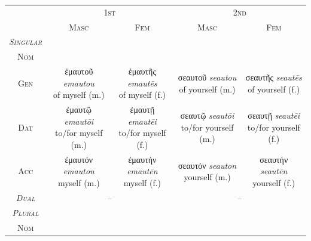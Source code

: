 \documentclass[10pt,a4paper,notitlepage]{article}
\newcommand{\tsc}[1]{\textsc{#1}}
\newcommand*{\grc}[1]{\fontspec{Inter}#1\rmfamily}
\newcommand{\trc}[1]{\textit{\fontspec{Tinos}#1}}
\begin{document}
    \begin{table}[H]
        \begin{tabular}{c|cccc}
             & \multicolumn{2}{c}{\tsc{1st}} & \multicolumn{2}{c}{\tsc{2nd}} \\
             & \tsc{Masc} & \tsc{Fem} & \tsc{Masc} & \tsc{Fem} \\

            \hline
            \emph{\tsc{Singular}} & & & & \\
             \tsc{Nom} & \makecell{--} & \makecell{--}
            & \makecell{--} & \makecell{--}\\

            \tsc{Gen} & \makecell{\grc{ἐμαυτοῦ} \trc{emautou} \\ \small of myself (m.)} & \makecell{\grc{ἐμαυτῆς} \trc{emautēs} \\ \small of myself (f.)}
            & \makecell{\grc{σεαυτοῦ} \trc{seautou} \\ \small of yourself (m.)} & \makecell{\grc{σεαυτῆς} \trc{seautēs} \\ \small of yourself (f.)}\\

            \tsc{Dat} & \makecell{\grc{ἐμαυτῷ} \trc{emautōi} \\ \small to/for myself (m.)} & \makecell{\grc{ἐμαυτῇ} \trc{emautēi} \\ \small to/for myself (f.)}
            & \makecell{\grc{σεαυτῷ} \trc{seautōi} \\ \small to/for yourself (m.)} & \makecell{\grc{σεαυτῇ} \trc{seautēi} \\ \small to/for yourself (f.)}\\

            \tsc{Acc} & \makecell{\grc{ἐμαυτόν} \trc{emauton} \\ \small myself (m.)} & \makecell{\grc{ἐμαυτήν} \trc{emautēn} \\ \small myself (f.)}
            & \makecell{\grc{σεαυτόν} \trc{seauton} \\ \small yourself (m.)} & \makecell{\grc{σεαυτήν} \trc{seautēn} \\ \small yourself (f.)}\\

            \hline
            \emph{\tsc{Dual}} & \multicolumn{2}{c}{--} & \multicolumn{2}{c}{--} \\

            \hline
            \emph{\tsc{Plural}} & & & & \\
            \tsc{Nom} & \makecell{--} & \makecell{--}
            & \makecell{--} & \makecell{--}\\


\end{tabular}
\end{table}
\end{document}
